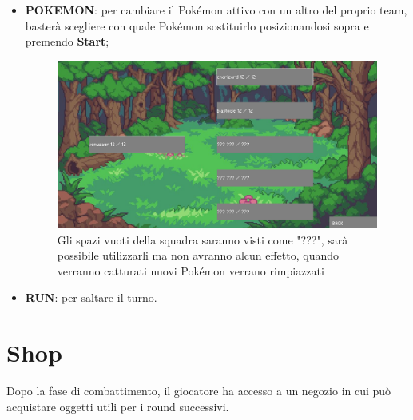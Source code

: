 \documentclass[a4paper,12pt]{report}
\begin{document}
{{\begin{itemize}
\begin{figure}[H]
    \caption{Ad ogni partita si parte con 5 Poké Ball ognuna di esse ha probabilità maggiore di cattura incrementale, fino ad arrivare alla Master Ball che ha una probabilità assicurata di cattura.}
    \label{fig:combat_phase}
\end{figure}
  \item \textbf{POKEMON}: per cambiare il Pokémon attivo con un altro del proprio team, basterà scegliere con quale Pokémon sostituirlo posizionandosi sopra e premendo \textbf{Start};
  \begin{figure}[H]
  \centering
    \includegraphics[width=\textwidth]{immagini/changePoke.png}
    \caption{Gli spazi vuoti della squadra saranno visti come "???", sarà possibile utilizzarli ma non avranno alcun effetto, quando verranno catturati nuovi Pokémon verrano rimpiazzati}
    \label{fig:combat_phase}
\end{figure}
  \item \textbf{RUN}: per saltare il turno.
\end{itemize}

\section{Shop}
Dopo la fase di combattimento, il giocatore ha accesso a un negozio in cui può acquistare oggetti utili per i round successivi.

}}
\end{document}
